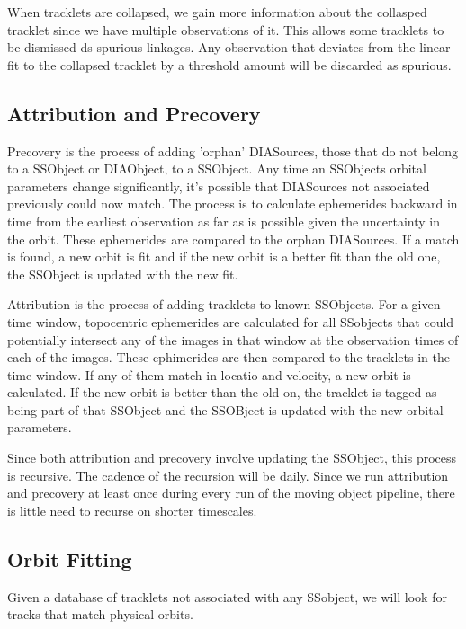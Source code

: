 When tracklets are collapsed, we gain more information about the collasped tracklet since we have multiple observations of it.  This allows some tracklets to be dismissed ds spurious linkages.  Any observation that deviates from the linear fit to the collapsed tracklet by a threshold amount will be discarded as spurious.

\subsection{Attribution and Precovery}
\label{sec:acAttributionAndPrecovery}
Precovery is the process of adding 'orphan' DIASources, those that do not belong to a SSObject or DIAObject, to a SSObject.  Any time an SSObjects orbital parameters change significantly, it's possible that DIASources not associated previously could now match.  The process is to calculate ephemerides backward in time from the earliest observation as far as is possible given the uncertainty in the orbit.  These ephemerides are compared to the orphan DIASources.  If a match is found, a new orbit is fit and if the new orbit is a better fit than the old one, the SSObject is updated with the new fit.

Attribution is the process of adding tracklets to known SSObjects.  For a given time window, topocentric ephemerides are calculated for all SSobjects that could potentially intersect any of the images in that window at the observation times of each of the images.  These ephimerides are then compared to the tracklets in the time window.  If any of them match in locatio and velocity, a new orbit is calculated.  If the new orbit is better than the old on, the tracklet is tagged as being part of that SSObject and the SSOBject is updated with the new orbital parameters.

Since both attribution and precovery involve updating the SSObject, this process is recursive.  The cadence of the recursion will be daily.  Since we run attribution and precovery at least once during every run of the moving object pipeline, there is little need to recurse on shorter timescales.

\subsection{Orbit Fitting}
\label{sec:acOrbitFitting}
Given a database of tracklets not associated with any SSobject, we will look for tracks that match physical orbits.


